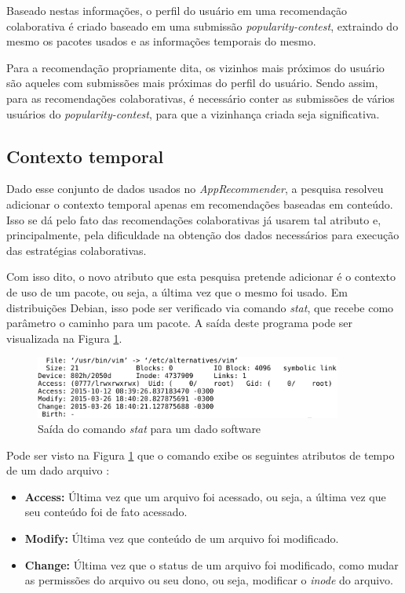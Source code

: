 Baseado nestas informações, o perfil do usuário em uma recomendação colaborativa
é criado baseado em uma submissão \textit{popularity-contest}, extraindo do mesmo os pacotes usados e
as informações temporais do mesmo.

Para a recomendação propriamente dita, os vizinhos mais próximos do usuário são
aqueles com submissões mais próximas do perfil do usuário. Sendo assim, para as
recomendações colaborativas, é necessário conter as submissões de vários
usuários do \textit{popularity-contest}, para que a vizinhança criada seja significativa.

\subsection{Contexto temporal} \label{sec:contexto_temporal}

Dado esse conjunto de dados usados no \textit{AppRecommender}, a pesquisa resolveu
adicionar o contexto temporal apenas em recomendações baseadas em conteúdo. Isso
se dá pelo fato das recomendações colaborativas já usarem tal atributo e,
principalmente, pela dificuldade na obtenção dos dados necessários para execução
das estratégias colaborativas.

Com isso dito, o novo atributo que esta pesquisa pretende
adicionar é o contexto de uso de um pacote, ou seja, a última vez que o
mesmo foi usado. Em distribuições Debian, isso pode ser verificado via comando
\textit{stat}, que recebe como parâmetro o caminho para um pacote.
A saída deste programa pode ser visualizada na Figura \ref{fig:comando_stat}.

\begin{figure}[h]
  \centering
  \includegraphics[width=0.9\textwidth]{figuras/comando_stat.eps}
  \caption{Saída do comando \textit{stat} para um dado software}
  \label{fig:comando_stat}
\end{figure}

Pode ser visto na Figura \ref{fig:comando_stat} que o comando exibe os seguintes
atributos de tempo de um dado arquivo \cite{1_haas}:

\begin{itemize}
    \item \textbf{Access:} Última vez que um arquivo foi acessado, ou seja, a
        última vez que seu conteúdo foi de fato acessado.
    \item \textbf{Modify:} Última vez que conteúdo de um arquivo foi modificado.
    \item \textbf{Change:} Última vez que o status de um arquivo foi modificado,
        como mudar as permissões do arquivo ou seu dono, ou seja, modificar o
        \textit{inode} do arquivo.
\end{itemize}


